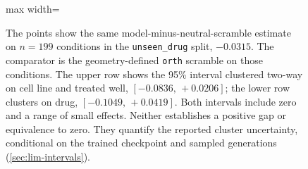 \begin{figure}[htbp]
\begin{fullwidth}
\begin{adjustbox}{max width=\linewidth}
\end{adjustbox}
\caption[The unseen-drug gap under two clusterings]{ The points show the same
model-minus-neutral-scramble estimate on $n = 199$ conditions in the
\texttt{unseen\_drug} split, $-0.0315$. The comparator is the
geometry-defined \texttt{orth} scramble on those conditions. The upper row
shows the 95\% interval clustered two-way on cell line and treated well,
$[-0.0836,\,+0.0206]$; the lower row clusters on drug,
$[-0.1049,\,+0.0419]$. Both intervals include zero and a range of small
effects. Neither establishes a positive gap or equivalence to zero. They
quantify the reported cluster uncertainty, conditional on the trained
checkpoint and sampled generations (\cref{sec:lim-intervals}).}
\label{fig:power}
\end{fullwidth}
\end{figure}
